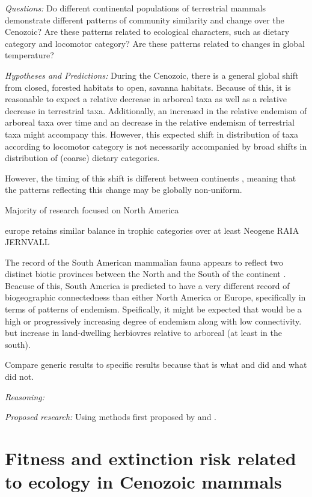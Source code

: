 \documentclass[12pt,letterpaper]{article}
\begin{document}
\textit{Questions:} Do different continental populations of terrestrial mammals demonstrate different patterns of community similarity and change over the Cenozoic? Are these patterns related to ecological characters, such as dietary category and locomotor category? Are these patterns related to changes in global temperature?

\textit{Hypotheses and Predictions:}
During the Cenozoic, there is a general global shift from closed, forested habitats to open, savanna habitats. Because of this, it is reasonable to expect a relative decrease in arboreal taxa as well as a relative decrease in terrestrial taxa. Additionally, an increased in the relative endemism of arboreal taxa over time and an decrease in the relative endemism of terrestrial taxa might accompany this. However, this expected shift in distribution of taxa according to locomotor category is not necessarily accompanied by broad shifts in distribution of (coarse) dietary categories.

However, the timing of this shift is different between continents \citep{Stromberg2005,Stromberg2013}, meaning that the patterns reflecting this change may be globally non-uniform.

Majority of research focused on North America

europe retains similar balance in trophic categories over at least Neogene RAIA JERNVALL 

The record of the South American mammalian fauna appears to reflect two distinct biotic provinces between the North and the South of the continent \citep{Macfadden1997,Macfadden2006,Flynn1998a,Patterson1968}. Beacuse of this, South America is predicted to have a very different record of biogeographic connectedness than either North America or Europe, specifically in terms of patterns of endemism. Speifically, it might be expected that would be a high or progressively increasing degree of endemism along with low connectivity. but increase in land-dwelling herbiovres relative to arboreal (at least in the south).

Compare generic results to specific results because that is what \citet{Jernvall2002} and \citet{Jernvall2004} did and what \citet{Tomiya2013} did not.

\textit{Reasoning:}

\textit{Proposed research:}
Using methods first proposed by \citet{Sidor2013} and \citet{Vilhena2013}.


\section{Fitness and extinction risk related to ecology in Cenozoic mammals}
\end{document}
